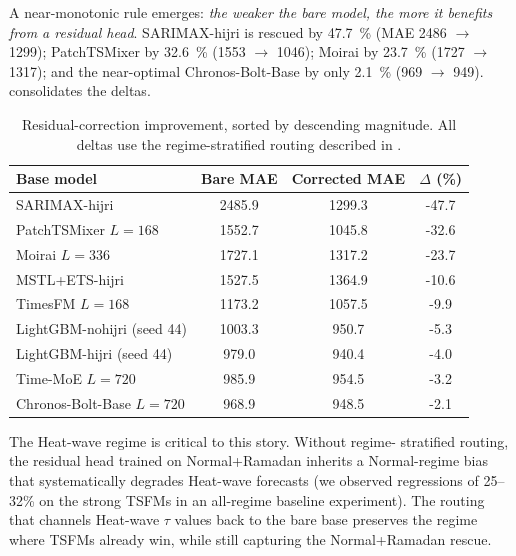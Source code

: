 \documentclass[10pt, a4paper, twocolumn]{article}
\begin{document}
A near-monotonic rule emerges: \emph{the weaker the bare model,
the more it benefits from a residual head}. SARIMAX-hijri is
rescued by \SI{47.7}{\percent} (MAE \num{2486} $\to$
\num{1299}); PatchTSMixer by \SI{32.6}{\percent} (\num{1553} $\to$
\num{1046}); Moirai by \SI{23.7}{\percent} (\num{1727} $\to$
\num{1317}); and the near-optimal Chronos-Bolt-Base by only
\SI{2.1}{\percent} (\num{969} $\to$ \num{949}).
 consolidates the deltas.

\begin{table}[!t]
  \centering
  \caption{Residual-correction improvement, sorted by descending
    magnitude. All deltas use the regime-stratified routing
    described in .}
  \label{tab:residual_summary}
  \small
  \begin{tabular}{l S[table-format=4.1] S[table-format=4.1] S[table-format=+2.1]}
    \toprule
    Base model & {Bare MAE} & {Corrected MAE} & {$\Delta$ (\%)} \\
    \midrule
    SARIMAX-hijri              & 2485.9 & 1299.3 & -47.7 \\
    PatchTSMixer $L{=}168$     & 1552.7 & 1045.8 & -32.6 \\
    Moirai $L{=}336$           & 1727.1 & 1317.2 & -23.7 \\
    MSTL+ETS-hijri             & 1527.5 & 1364.9 & -10.6 \\
    TimesFM $L{=}168$          & 1173.2 & 1057.5 &  -9.9 \\
    LightGBM-nohijri (seed 44) & 1003.3 &  950.7 &  -5.3 \\
    LightGBM-hijri (seed 44)   &  979.0 &  940.4 &  -4.0 \\
    Time-MoE $L{=}720$         &  985.9 &  954.5 &  -3.2 \\
    Chronos-Bolt-Base $L{=}720$ &  968.9 &  948.5 &  -2.1 \\
    \bottomrule
  \end{tabular}
\end{table}

The Heat-wave regime is critical to this story. Without regime-
stratified routing, the residual head trained on Normal+Ramadan
inherits a Normal-regime bias that systematically degrades
Heat-wave forecasts (we observed regressions of 25--32\% on the
strong TSFMs in an all-regime baseline experiment). The routing
that channels Heat-wave $\tau$ values back to the bare base
preserves the regime where TSFMs already win, while still
capturing the Normal+Ramadan rescue.
\end{document}
